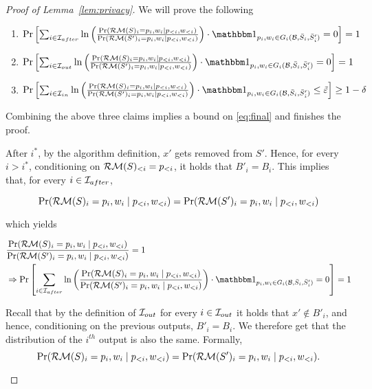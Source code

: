 \documentclass[12pt,a4paper,oneside,onecolumn]{book}
\begin{document}
\begin{proof}[Proof of Lemma~\ref{lem:privacy}]
We will prove the following
\begin{enumerate}[label=(\roman*)]
\item $\Pr\left[\sum_{i\in \event{after}}\ln
    \left(
      \frac{\Pr(\RandMargin(S)_i=p_i,w_i\mid p_{<i},w_{<i})}
      {\Pr(\RandMargin(S')_i=p_i,w_i\mid p_{<i},w_{<i})}
    \right)
    \cdot \indicator{p_i,w_i \in G_{i}(\blackbox,\bar{S}_i,\bar{S}_i')}
    = 0 \right] = 1$
\item $ \Pr\left[\sum_{i\in \event{out}}\ln
    \left(
      \frac{\Pr(\RandMargin(S)_i=p_i,w_i\mid p_{<i},w_{<i})}
      {\Pr(\RandMargin(S')_i=p_i,w_i\mid p_{<i},w_{<i})}
    \right)
    \cdot \indicator{p_i,w_i \in G_{i}(\blackbox,\bar{S}_i,\bar{S}_i')}
    = 0 \right] = 1$
 \item $ \Pr\left[\sum_{i\in \event{in}}\ln
     \left(
       \frac{\Pr(\RandMargin(S)_i=p_i,w_i\mid p_{<i},w_{<i})}
       {\Pr(\RandMargin(S')_i=p_i,w_i\mid p_{<i},w_{<i})}
     \right) 
     \cdot \indicator{p_i,w_i \in G_{i}(\blackbox,\bar{S}_i,\bar{S}_i')}
     \leq \bigeps \right] \geq 1-\delta$
\end{enumerate}

Combining the above three claims implies a bound on \eqref{eq:final} and finishes the proof.

\begin{innerproof}[Proof of (i)]
  After $i^*$,
  by the algorithm definition,
  $x'$ gets removed from $S'$.
  Hence, for every $i > i^*$,
  conditioning on $\mathcal{RM}(S)_{<i}=p_{<i}$,
  it holds that $B'_i = B_i$.
  This implies that, for every 
  $i \in \mathcal{I}_{after}$,
  
  \[
    \Pr(\mathcal{RM}(S)_i=p_i,w_i\mid p_{<i},w_{<i})
    =
    \Pr(\mathcal{RM}(S')_i=p_i,w_i\mid p_{<i},w_{<i})
  \]
  
  which yields
  
  \begin{align*}
    &\frac{\Pr(\RandMargin(S)_i=p_i,w_i\mid p_{<i},w_{<i})}
      {\Pr(\RandMargin(S')_i=p_i,w_i\mid p_{<i},w_{<i})} = 1 \\
    &\Rightarrow
      \Pr\left[\sum_{i\in \event{after}}\ln
      \left(
      \frac{\Pr(\RandMargin(S)_i=p_i,w_i\mid p_{<i},w_{<i})}
      {\Pr(\RandMargin(S')_i=p_i,w_i\mid p_{<i},w_{<i})}
      \right) 
      \cdot \indicator{p_i,w_i \in G_{i}(\blackbox,\bar{S}_i,\bar{S}_i')}
      = 0 \right] = 1
  \end{align*}  
\end{innerproof}

\begin{innerproof}[Proof of (ii)]
  Recall that by the definition of $\mathcal{I}_{out}$
  for every $i \in \mathcal{I}_{out}$ it holds that
  $x' \notin B'_i$, and hence,
  conditioning on the previous outputs,
  $B'_i = B_i$. 
  We therefore get that the distribution of the $i^{th}$  output is also the same. 
  Formally, 
  $$\Pr(\mathcal{RM}(S)_i=p_i,w_i\mid p_{<i},w_{<i})
  =
  \Pr(\mathcal{RM}(S')_i=p_i,w_i\mid p_{<i},w_{<i}).$$
  

\end{innerproof}
\end{proof}
\end{document}

